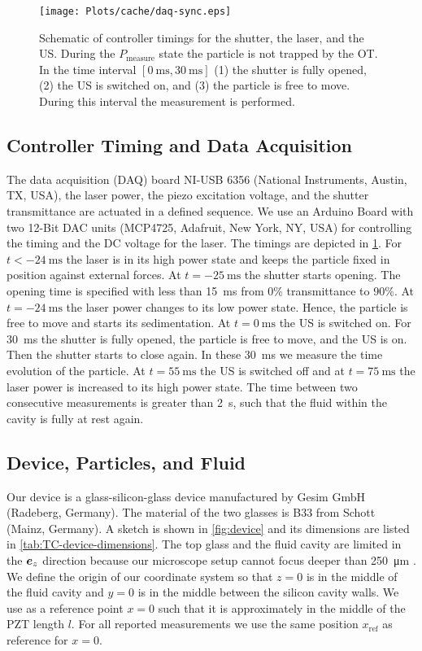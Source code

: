 \begin{figure}[H]
  \centering
  \texttt{[image: Plots/cache/daq-sync.eps]}
  \caption{Schematic of controller timings for the shutter, the laser, and the 
      US. During the $P_{\text{measure}}$ state the particle is not trapped by 
  the OT. In the time interval $[\SI{0}{\ms}, \SI{30}{\ms}]$ (1) the shutter is 
  fully opened, (2) the US is switched on, and (3) the particle is free to 
  move. During this interval the measurement is performed.}\label{fig:daq-sync}
\end{figure}

\subsection{Controller Timing and Data Acquisition}

The data acquisition (DAQ) board NI-USB 6356 (National Instruments, Austin, TX, 
USA), the laser power, the piezo excitation voltage, and the shutter 
transmittance are actuated in a defined sequence. We use an Arduino Board with 
two 12-Bit DAC units (MCP4725, Adafruit, New York, NY, USA) for controlling the 
timing and the DC voltage for the laser. The timings are depicted in 
\cref{fig:daq-sync}. For $t<-\SI{24}{\ms}$ the laser is in its high power state 
and keeps the particle fixed in position against external forces. At 
$t=\SI{-25}{\ms}$ the shutter starts opening. The opening time is specified 
with less than \SI{15}{\ms} from 0\% transmittance to 90\%. At 
$t=\SI{-24}{\ms}$ the laser power changes to its low power state. Hence, the 
particle is free to move and starts its sedimentation. At $t=\SI{0}{\ms}$ the 
US is switched on. For \SI{30}{\ms} the shutter is fully opened, the particle 
is free to move, and the US is on. Then the shutter starts to close again. In 
these \SI{30}{\ms} we measure the time evolution of the particle. At 
$t=\SI{55}{\ms}$ the US is switched off and at $t=\SI{75}{\ms}$ the laser power 
is increased to its high power state. The time between two consecutive 
measurements is greater than \SI{2}{\s}, such that the fluid within the cavity 
is fully at rest again.

\subsection{Device, Particles, and Fluid}

Our device is a glass-silicon-glass device manufactured by Gesim GmbH 
(Radeberg, Germany). The material of the two glasses is B33 from Schott (Mainz, 
Germany). A sketch is shown in \cref{fig:device} and its dimensions are listed 
in \cref{tab:TC-device-dimensions}. The top glass and the fluid cavity are limited 
in the $\bm{e}_{z}$ direction because our microscope setup cannot focus deeper than 
\SI{250}{\um} \cite{Lamprecht2016,Lamprecht2017}. We define the origin of our 
coordinate system so that $z = 0$ is in the middle of the fluid cavity and $y = 
0$ is in the middle between the silicon cavity walls. We use as a reference 
point $x = 0$ such that it is approximately in the middle of the PZT length 
$l$. For all reported measurements we use the same position $x_{\text{ref}}$ as 
reference for $x=0$.

